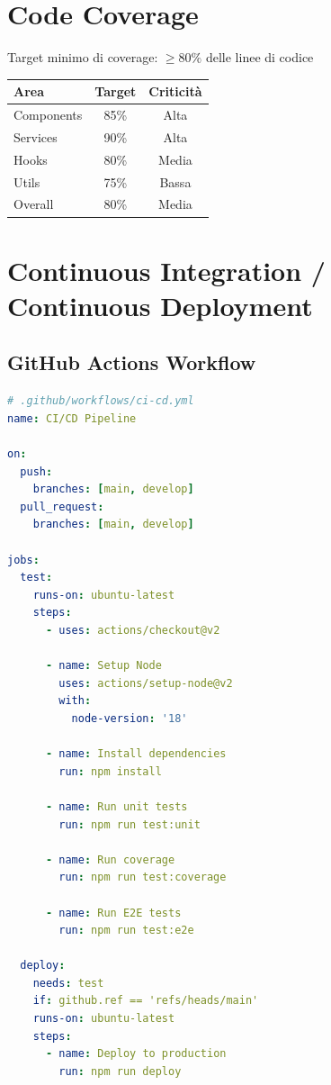 \documentclass[12pt,a4paper]{report}
\begin{document}
\section{Code Coverage}

Target minimo di coverage: $\geq 80\%$ delle linee di codice

\begin{table}[H]
    \centering
    \begin{tabular}{|l|c|c|}
        \hline
        \textbf{Area} & \textbf{Target} & \textbf{Criticità} \\
        \hline
        Components & 85\% & Alta \\
        \hline
        Services & 90\% & Alta \\
        \hline
        Hooks & 80\% & Media \\
        \hline
        Utils & 75\% & Bassa \\
        \hline
        Overall & 80\% & Media \\
        \hline
    \end{tabular}
\end{table}

\section{Continuous Integration / Continuous Deployment}

\subsection{GitHub Actions Workflow}

\begin{lstlisting}[language=yaml]
# .github/workflows/ci-cd.yml
name: CI/CD Pipeline

on:
  push:
    branches: [main, develop]
  pull_request:
    branches: [main, develop]

jobs:
  test:
    runs-on: ubuntu-latest
    steps:
      - uses: actions/checkout@v2
      
      - name: Setup Node
        uses: actions/setup-node@v2
        with:
          node-version: '18'
      
      - name: Install dependencies
        run: npm install
      
      - name: Run unit tests
        run: npm run test:unit
      
      - name: Run coverage
        run: npm run test:coverage
      
      - name: Run E2E tests
        run: npm run test:e2e
  
  deploy:
    needs: test
    if: github.ref == 'refs/heads/main'
    runs-on: ubuntu-latest
    steps:
      - name: Deploy to production
        run: npm run deploy
\end{lstlisting}
\end{document}
